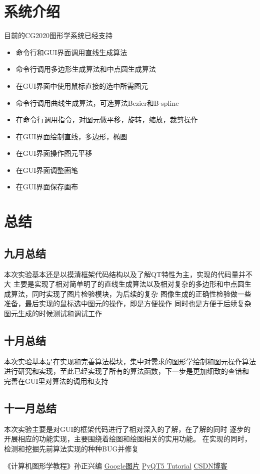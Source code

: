 \documentclass[a4paper,UTF8]{article}
\theoremstyle{definition}
\begin{document}
\section{系统介绍}
目前的CG2020图形学系统已经支持
\begin{itemize}
    \item 命令行和GUI界面调用直线生成算法
    \item 命令行调用多边形生成算法和中点圆生成算法
    \item 在GUI界面中使用鼠标直接的选中所需图元
    \item 命令行调用曲线生成算法，可选算法Bezier和B-spline
    \item 在命令行调用指令，对图元做平移，旋转，缩放，裁剪操作
    \item 在GUI界面绘制直线，多边形，椭圆
    \item 在GUI界面操作图元平移
    \item 在GUI界面调整画笔
    \item 在GUI界面保存画布
\end{itemize}

\section{总结}
\subsection{九月总结}
本次实验基本还是以摸清框架代码结构以及了解QT特性为主，实现的代码量并不大
主要是实现了相对简单明了的直线生成算法以及相对复杂的多边形和中点圆生成算法，同时实现了图片检验模块，为后续的复杂
图像生成的正确性检验做一些准备，最后实现的鼠标选中图元的操作，即是方便操作
同时也是方便于后续复杂图元生成的时候测试和调试工作

\subsection{十月总结}
本次实验基本是在实现和完善算法模块，集中对需求的图形学绘制和图元操作算法
进行研究和实现，至此已经实现了所有的算法函数，下一步是更加细致的查错和
完善在GUI里对算法的调用和支持

\subsection{十一月总结}
本次实验主要是对GUI的框架代码进行了相对深入的了解，在了解的同时
逐步的开展相应的功能实现，主要围绕着绘图和绘图相关的实用功能。
在实现的同时，检测和挖掘先前算法实现的种种BUG并修复




\begin{thebibliography}{99}  
    《计算机图形学教程》孙正兴编 
     \href{https://www.google.com/imghp?hl=zh-CN&ogbl}{Google图片}
     \href{https://build-system.fman.io/pyqt5-tutorial}{PyQT5 Tutorial}
     \href{https://blog.csdn.net/shenziheng1/article/details/54411098}{CSDN博客}
\end{thebibliography}
\end{document}
